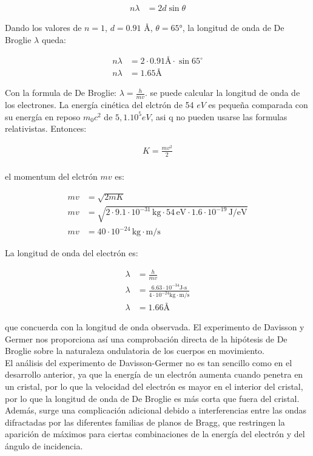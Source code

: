 \documentclass[a4paper]{article}
\begin{document}
    \begin{align}
        n\lambda &= 2d \sin \theta \tag*{}
    \end{align}

    \indent Dando los valores de $n=1$, $d=0.91$ \AA, $\theta=65°$, la longitud de onda de De Broglie $\lambda$ queda:

    \begin{align}
        n\lambda &= 2 \cdot 0.91 \text{\AA} \cdot \sin 65^\circ \tag*{} \\[10pt]
        n\lambda &= 1.65 \text{\AA} \tag*{}
    \end{align}

    \indent Con la formula de De Broglie: $\lambda=\frac{h}{mv}$. se puede calcular la longitud de onda de los electrones. La energía cinética del elctrón de 54 $eV$ es pequeña comparada con su energía en reposo $m_0c^2$
    de $5,1.10^5 eV$, asi q no pueden usarse las formulas relativistas. Entonces:

    \begin{align}
        K=\frac{mv^2}{2} \tag*{} \\[10pt]
    \end{align}

    \indent el momentum del elctrón $mv$ es:

    \begin{align}
        mv &=\sqrt{2mK} \tag*{} \\[10pt]
        mv &=\sqrt{2 \cdot 9.1 \cdot 10^{-31} \, \text{kg} \cdot 54 \, \text{eV} \cdot 1.6 \cdot 10^{-19} \, \text{J/eV}} \tag*{} \\[10pt]
        mv &= 40 \cdot 10^{-24} \, \text{kg} \cdot \text{m/s} \tag*{}
    \end{align}

    \indent La longitud de onda del electrón es:

    \begin{align}
        \lambda &= \frac{h}{mv} \tag*{} \\[10pt]
        \lambda &= \frac{6.63 \cdot 10^{-34} \text{J-s}}{4 \cdot 10^{-24} \text{kg} \cdot \text{m/s}} \tag*{} \\[10pt]
        \lambda &= 1.66 \text{Å} \tag*{}
    \end{align}

    \indent que concuerda con la longitud de onda observada. El experimento de Davisson y Germer nos proporciona así una comprobación directa de la hipótesis de De Broglie sobre la naturaleza ondulatoria de los cuerpos en movimiento.\\
    \indent El análisis del experimento de Davisson-Germer no es tan sencillo como en el desarrollo anterior, ya que la energía de un electrón aumenta cuando penetra en un cristal, por lo que la velocidad del electrón es mayor en el interior del cristal, por lo que la longitud de onda de De Broglie es más corta que fuera del cristal. Además, surge una complicación adicional debido a interferencias entre las ondas difractadas por las diferentes familias de planos de Bragg, que restringen la aparición de máximos para ciertas combinaciones de la energía del electrón y del ángulo de incidencia.\\
\end{document}
